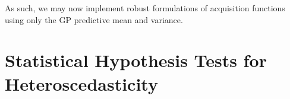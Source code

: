 \documentclass[jair,twoside,11pt,theapa]{article}
\theoremstyle{definition}
\begin{document}
As such, we may now implement robust formulations of acquisition functions using only the GP predictive mean and variance.















































































































\section{Statistical Hypothesis Tests for Heteroscedasticity}\label{sec:hyp_test_app}
\end{document}
